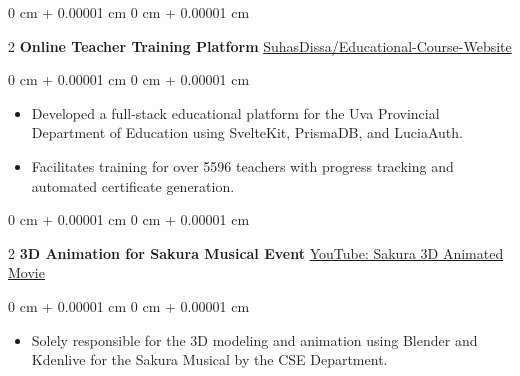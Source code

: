 \documentclass[10pt, letterpaper]{article}
\newenvironment{highlights}{ \begin{itemize}[ topsep=0.10 cm, parsep=0.10 cm, partopsep=0pt,
itemsep=0pt, leftmargin=0 cm + 10pt ] }{ \end{itemize} } %
\newenvironment{onecolentry}{ \begin{adjustwidth}{ 0 cm + 0.00001 cm }{ 0 cm + 0.00001 cm }
}{ \end{adjustwidth} } %
\newenvironment{twocolentry}[2][]{ \onecolentry \def\secondColumn{#2} \setcolumnwidth{\fill, 4.5 cm}
\begin{paracol}{2} }{ \switchcolumn \raggedleft \secondColumn \end{paracol}
\endonecolentry } %
\begin{document}
  \begin{twocolentry}
    {\href{https://github.com/SuhasDissa/Educational-Course-Website}{SuhasDissa/Educational-Course-Website}}
    \textbf{Online Teacher Training Platform}
  \end{twocolentry}
  \vspace{0.10 cm}
  \begin{onecolentry}
    \begin{highlights}
      \item Developed a full-stack educational platform for the Uva Provincial Department
      of Education using SvelteKit, PrismaDB, and LuciaAuth. \item Facilitates
      training for over 5596 teachers with progress tracking and automated
      certificate generation.
    \end{highlights}
  \end{onecolentry}

  \vspace{0.5 cm}

  \begin{twocolentry}
    {\href{https://www.youtube.com/watch?v=appDAUeFnWI}{YouTube: Sakura 3D Animated Movie}}
    \textbf{3D Animation for Sakura Musical Event}
  \end{twocolentry}
  \vspace{0.10 cm}
  \begin{onecolentry}
    \begin{highlights}
      \item Solely responsible for the 3D modeling and animation using Blender and
      Kdenlive for the Sakura Musical by the CSE Department.
    \end{highlights}
  \end{onecolentry}
\end{document}
